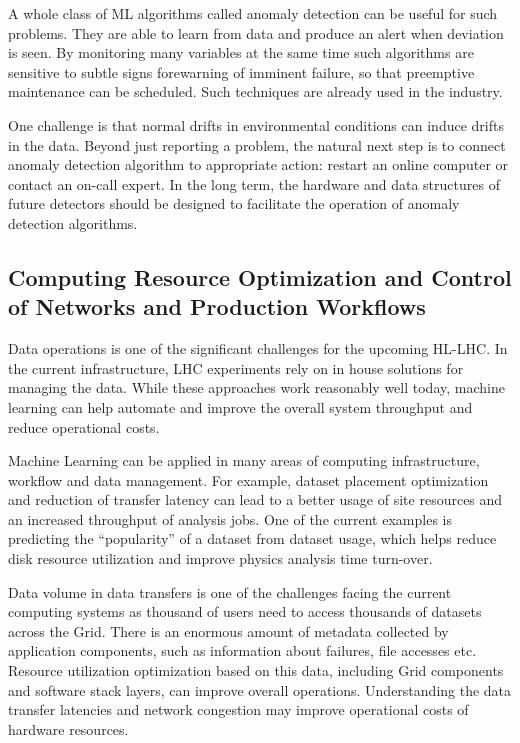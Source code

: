 A whole class of ML algorithms called anomaly detection can be useful for such problems. They are able to learn from data and produce an alert when deviation is seen. By monitoring many variables at the same time such algorithms are sensitive to subtle signs forewarning of imminent failure, so that preemptive maintenance can be scheduled. Such techniques are already used in the industry.

One challenge is that normal drifts in environmental conditions can induce drifts in the data. Beyond just reporting a problem, the natural next step is to connect anomaly detection algorithm to appropriate action: restart an online computer or contact an on-call expert. In the long term, the hardware and data structures of future detectors should be designed to facilitate the operation of anomaly detection algorithms.

\subsection{Computing Resource Optimization and Control of Networks and Production Workflows}
\label{sec:resource-optimization}

Data operations is one of the significant challenges for the upcoming HL-LHC. In the current infrastructure, LHC experiments rely on in house solutions for managing the data. While these approaches work reasonably well today, machine learning can help automate and improve the overall system throughput and reduce operational costs.

Machine Learning can be applied in many areas of computing infrastructure, workflow and data management. For example, dataset placement optimization and reduction of transfer latency can lead to a better usage of site resources and an increased throughput of analysis jobs. One of the current examples is predicting the ``popularity'' of a dataset from dataset usage, which helps reduce disk resource utilization and improve physics analysis time turn-over.

Data volume in data transfers is one of the challenges facing the current computing systems as thousand of users need to access thousands of datasets across the Grid. There is an enormous amount of metadata collected by application components, such as information about failures, file accesses etc. Resource utilization optimization based on this data, including Grid components and software stack layers, can improve overall operations. Understanding the data transfer latencies and network congestion may improve operational costs of hardware resources.

